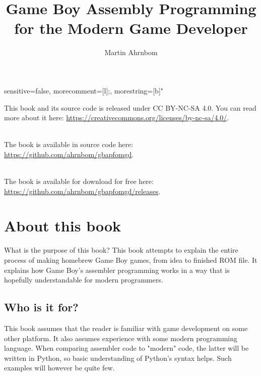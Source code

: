 \documentclass[11pt]{book}
\title{Game Boy Assembly Programming for the Modern Game Developer}
\author{Martin Ahrnbom}
\begin{document}
\maketitle

{
  sensitive=false,
  morecomment=[l]{;}, 
  morestring=[b]" 
}



\lstMakeShortInline{\|}

\noindent \small{This book and its source code is released under CC BY-NC-SA 4.0. You can read more about it here: \url{https://creativecommons.org/licenses/by-nc-sa/4.0/}. 

~\\
\noindent The book is available in source code here: \url{https://github.com/ahrnbom/gbapfomgd}.

~\\
\noindent 
The book is available for download for free here: \url{https://github.com/ahrnbom/gbapfomgd/releases}.
}

\tableofcontents

\chapter{About this book}
What is the purpose of this book?
This book attempts to explain the entire process of making homebrew Game Boy games, from idea to finished ROM file. It explains how Game Boy's assembler programming works in a way that is hopefully understandable for modern programmers. 

\section{Who is it for?}
This book assumes that the reader is familiar with game development on some other platform. It also assumes experience with some modern programming language. When comparing assembler code to "modern" code, the latter will be written in Python, so basic understanding of Python's syntax helps. Such examples will however be quite few.
\end{document}
